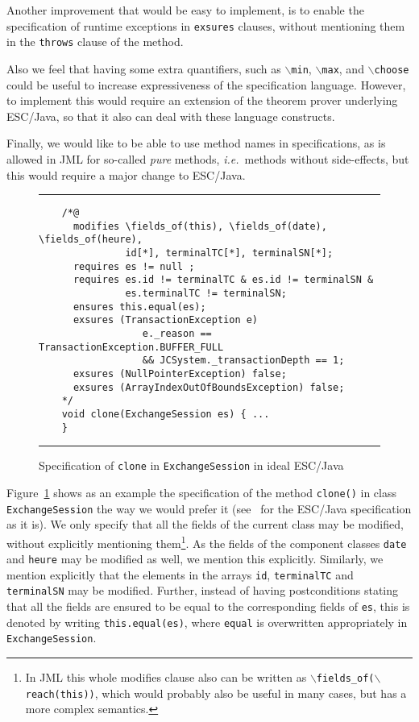 \documentclass[a4paper]{llncs}
\newcommand{\fieldsof}{\(\backslash\)\texttt{fields\_of}}
\newcommand{\reach}{\(\backslash\)\texttt{reach}}
\begin{document}
Another improvement that would be easy to implement, is to enable the
specification of runtime exceptions in \texttt{exsures} clauses,
without mentioning them in the \texttt{throws} clause of the method.

Also we feel that having some extra quantifiers, such as
\texttt{\(\backslash\)min},
\texttt{\(\backslash\)max}, and \texttt{\(\backslash\)choose} could be 
useful to increase expressiveness of the specification
language. However, to implement this would require an extension of the 
theorem prover underlying ESC/Java, so that it also can deal with
these language constructs.

Finally, we would like to be able to use method
names in specifications, as is allowed in JML for so-called
\emph{pure} methods, \emph{i.e.}~methods without
side-effects, but this would require a major change to ESC/Java.


\begin{figure}[t]
\rule{\linewidth}{0.3mm}
\begin{verbatim}
    /*@
      modifies \fields_of(this), \fields_of(date), \fields_of(heure),
               id[*], terminalTC[*], terminalSN[*];
      requires es != null ;
      requires es.id != terminalTC & es.id != terminalSN &
               es.terminalTC != terminalSN;
      ensures this.equal(es);
      exsures (TransactionException e) 
                  e._reason == TransactionException.BUFFER_FULL 
                  && JCSystem._transactionDepth == 1; 
      exsures (NullPointerException) false;
      exsures (ArrayIndexOutOfBoundsException) false;
    */
    void clone(ExchangeSession es) { ...
    } 
\end{verbatim}
\caption{Specification of \texttt{clone} in \texttt{ExchangeSession}
in ideal ESC/Java}
\label{FigIdealESC}
\rule{\linewidth}{0.3mm}
\end{figure}

Figure~\ref{FigIdealESC} shows as an example the
specification of the method \texttt{clone()} in class
\texttt{ExchangeSession} the way we would prefer it (see~\cite{CatanoH01Url} for the
ESC/Java specification as it is). We only specify that all the fields
of the current class may be modified, without explicitly mentioning
them\footnote{In JML this whole modifies clause also can be written
as \texttt{\fieldsof(\reach(this))}, which would probably also be
useful in many cases, but has a more complex semantics.}. As
the fields of the component classes \texttt{date} and
\texttt{heure} may be modified as well, we mention this
explicitly. Similarly, we mention explicitly that the elements in the
arrays \texttt{id}, \texttt{terminalTC} and \texttt{terminalSN} may be
modified. Further, instead of
having postconditions stating that all the fields are ensured to be
equal to the corresponding fields of \texttt{es}, this is denoted by
writing \texttt{this.equal(es)}, where \texttt{equal} is overwritten
appropriately in \texttt{ExchangeSession}.
\end{document}

